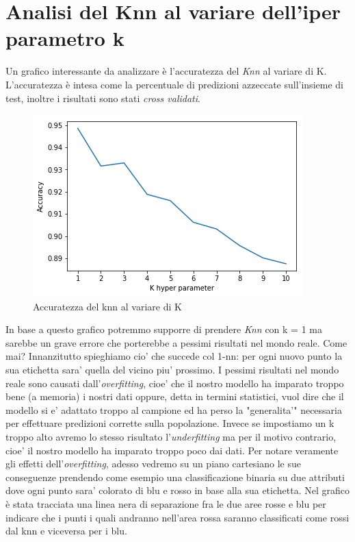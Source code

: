 \section{Analisi del Knn al variare dell'iper parametro k}
Un grafico interessante da analizzare \`e l'accuratezza del \textit{Knn} al variare di K. L'accuratezza \`e intesa come la percentuale di predizioni azzeccate sull'insieme di test, inoltre i risultati sono stati \textit{cross validati}.
\begin{figure}[H]
	\centering
	\includegraphics[width=0.7\linewidth]{img/accuracy_knn}
	\caption{Accuratezza del knn al variare di K}
	\label{fig:accuracyknn}
\end{figure}
In base a questo grafico potremmo supporre di prendere \textit{Knn} con k = 1 ma sarebbe un grave errore che porterebbe a pessimi risultati nel mondo reale. Come mai? Innanzitutto spieghiamo cio' che succede col 1-nn: per ogni nuovo punto la sua etichetta sara' quella del vicino piu' prossimo. I pessimi risultati nel mondo reale sono causati dall'\textit{overfitting}, cioe' che il nostro modello ha imparato troppo bene (a memoria) i nostri dati oppure, detta in termini statistici, vuol dire che il modello si e' adattato troppo al campione ed ha perso la "generalita'" necessaria per effettuare predizioni corrette sulla popolazione. Invece se impostiamo un k troppo alto avremo lo stesso risultato l'\textit{underfitting} ma per il motivo contrario, cioe' il nostro modello ha imparato troppo poco dai dati. Per notare veramente gli effetti dell'\textit{overfitting}, adesso vedremo su un piano cartesiano le sue conseguenze prendendo come esempio una classificazione binaria su due attributi dove ogni punto sara' colorato di blu e rosso in base alla sua etichetta. Nel grafico \`e stata tracciata una linea nera di separazione fra le due aree rosse e blu per indicare che i punti i quali andranno nell'area rossa saranno classificati come rossi dal knn e viceversa per i blu. 

